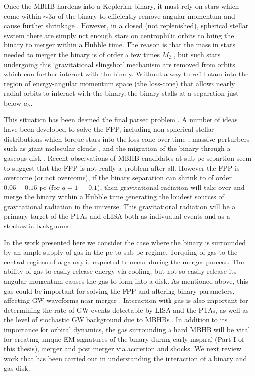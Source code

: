 Once the MBHB hardens into a Keplerian binary, it must rely on stars which
come within $\sim3a$ of the binary to efficiently remove angular momentum and
cause further shrinkage \citep{Saslaw+2005}. However, in a closed (not
replenished),  spherical stellar system there are simply not enough stars on
centrophilic orbits to bring the binary to merger within a Hubble time. The
reason is that the mass in stars needed to merger the binary is of order a few
times $M_2$ \citep{MerrittMilos:2005}, but such stars undergoing this
`gravitational slingshot' mechanism are removed from orbits which can further
interact with the binary. Without a way to refill stars into the region of
energy-angular momentum space (the loss-cone) that allows nearly radial orbits
to interact with the binary, the binary stalls at a separation just below
$a_h$.

This situation has been deemed the final parsec problem
\citep[FPP][]{MilosPhinney:2001}. A number of ideas have been developed to
solve the FPP, including non-spherical stellar distributions which torque
stars into the loss cone over time \citep{triaxialFPPsolns}, massive
perturbers such as giant molecular clouds \citep{massivpertFPPsolns}, and the
migration of the binary through a gaseous disk \citep{GoldRix:2000,
ArmNat:2002:ApJL}. Recent observations of MBHB cnadidates at sub-pc separtion
seem to suggest that the FPP is not really a problem after all. However the
FPP is overcome (or not overcome), if the binary separation can shrink to of
order $0.05-0.15$ pc (for $q=1 \rightarrow 0.1$), then gravitational radiation
will take over and merge the binary within a Hubble time \citep{Peters:1964}
generating the loudest sources of gravitational radiation in the universe.
This gravitational radiation will be a primary target of the PTAs and eLISA
both as indivudual events and as a stochastic background.

In the work presented here we consider the case where the binary is surrounded
by an ample supply of gas in the pc to sub-pc regime. Torquing of gas to the
central regions of a galaxy is expected to occur during the merger
process\citep{BarnesHernquist:1996, Barnes:2002}. The ability of gas to easily
release energy via cooling, but not so easily release its angular momentum
causes the gas to form into a disk. As mentioned above, this gas could be
important for solving the FPP and altering binary parameters, affecting GW
waveforms near merger \citep[\emph{e.g.}][]{ArmNat:2005, YKH:2011:L,
RoedigSesana:2012, Sesana:2016}. Interaction with gas is also important for
determining the rate of GW events detectable by LISA and the PTAs, as well as
the level of stochastic GW background due to MBHBs \citep{SesanaKocsis:,
Shannon:2015, PTAsGWB}. In addition to its importance for orbital dynamics,
the gas surrounding a hard MBHB will be vital for creating unique EM
signatures of the binary during early inspiral (Part I of this thesis), merger
\citep{squeezing} and post merger \citep{kickEMsigs} via accretion and shocks.
We next review work that has been carried out in understanding the interaction
of a binary and gas disk.

